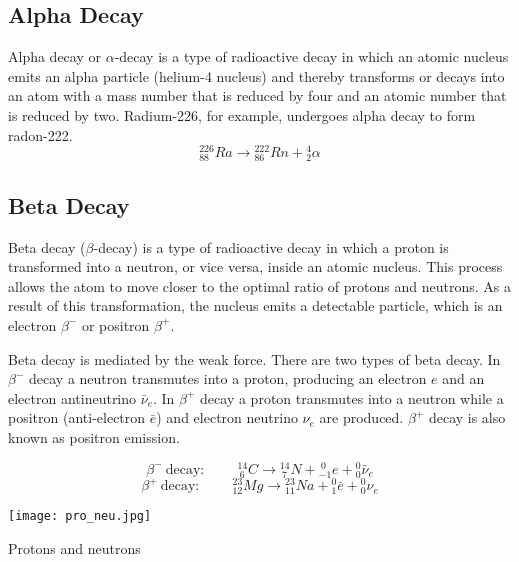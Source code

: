 \subsection{Alpha Decay}
Alpha decay or $\alpha$-decay is a type of radioactive decay in which an atomic nucleus emits an alpha particle (helium-4 nucleus) and thereby transforms or decays into an atom with a mass number that is reduced by four and an atomic number that is reduced by two.  
Radium-226, for example, undergoes alpha decay to form radon-222.
$${}_{88}^{226}Ra \longrightarrow {}_{86}^{222}Rn +{}_{2}^{4}\alpha$$
\subsection{Beta Decay}
Beta decay ($\beta$-decay) is a type of radioactive decay in which a proton is transformed into a neutron, or vice versa, inside an atomic nucleus. This process allows the atom to move closer to the optimal ratio of protons and neutrons. As a result of this transformation, the nucleus emits a detectable particle, which is an electron $\beta^-$ or positron $\beta^+$.

Beta decay is mediated by the weak force. There are two types of beta decay.  In $\beta^-$ decay a neutron transmutes into a proton, producing an electron $e$ and an electron antineutrino $\bar{\nu}_e$.  In $\beta^+$ decay a proton transmutes into a neutron while a positron (anti-electron $\bar{e}$) and electron neutrino $\nu_e$ are produced.  $\beta^+$ decay is also known as positron emission.

$$\beta^-\  \text{decay:} \hspace{1cm} {}_{\ 6}^{14}C \longrightarrow {}_{\ 7}^{14}N +{}_{-1}^{\ 0}e + {}_{0}^{0}\bar{\nu}_e$$
$$\beta^+\  \text{decay:} \hspace{1cm}{}_{12}^{23}Mg \longrightarrow {}_{11}^{23}Na +{}_{1}^{0}\bar{e} + {}_{0}^{0}\nu_e$$
\begin{marginfigure}[-50pt]
  \texttt{[image: pro\_neu.jpg]}
  \caption{Protons and neutrons}
  \label{fig:fig}
\end{marginfigure}

\newpage

